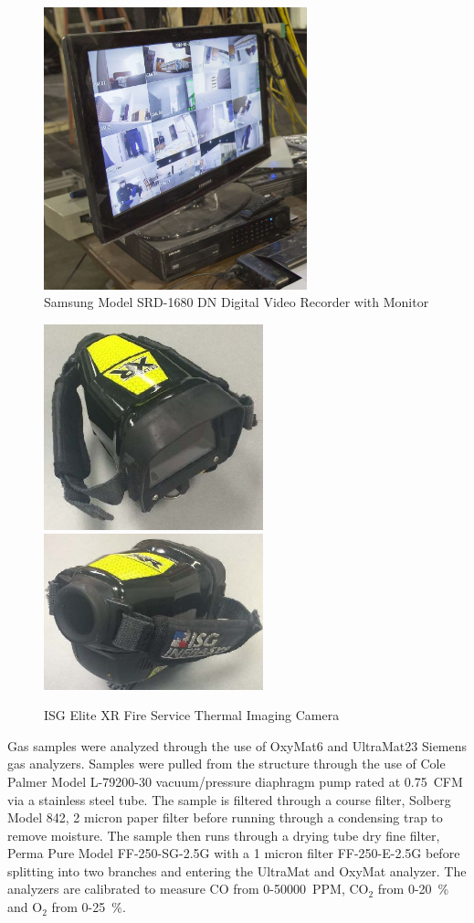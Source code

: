\documentclass[12pt,oneside]{book}
\begin{document}
\begin{figure}[H]
	\centering
	\includegraphics[width = 3in]{0_Images/Instrumentation/DVR.jpg}

	\caption{Samsung Model SRD-1680 DN Digital Video Recorder with Monitor}
	\label{fig:DVR}
\end{figure}

\begin{figure}[H]
	\centering
	\includegraphics[width = 2.5in]{0_Images/Instrumentation/ISG_IR.jpg}
	\includegraphics[width = 2.5in]{0_Images/Instrumentation/ISG_IR2.jpg}
	\caption{ISG Elite XR Fire Service Thermal Imaging Camera}
	\label{fig:IRCam}
\end{figure}

Gas samples were analyzed through the use of OxyMat6 and UltraMat23 Siemens gas analyzers. Samples were pulled from the structure through the use of Cole Palmer Model L-79200-30 vacuum/pressure diaphragm pump rated at 0.75~CFM via a stainless steel tube. The sample is filtered through a course filter, Solberg Model 842, 2 micron paper filter before running through a condensing trap to remove moisture. The sample then runs through a drying tube dry fine filter, Perma Pure Model FF-250-SG-2.5G with a 1 micron filter FF-250-E-2.5G before splitting into two branches and entering the UltraMat and OxyMat analyzer. The analyzers are calibrated to measure CO from 0-50000~PPM, CO$_2$ from 0-20~\% and O$_2$ from 0-25~\%. 
\end{document}
